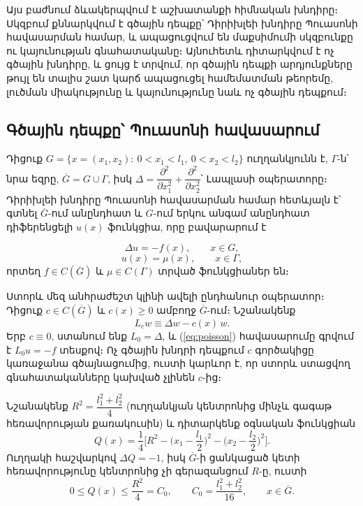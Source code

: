 \documentclass[12pt,a4paper]{article}
\theoremstyle{arm}
\theoremstyle{armdef}
\numberwithin{equation}{section}
\newcommand{\G}{\overline{G}}
\begin{document}
Այս բաժնում ձևակերպվում է աշխատանքի հիմնական խնդիրը։ Սկզբում քննարկվում է գծային դեպքը՝ Դիրիխլեի խնդիրը Պուասոնի հավասարման համար, և ապացուցվում են մաքսիմումի սկզբունքը ու կայունության գնահատականը։ Այնուհետև դիտարկվում է ոչ գծային խնդիրը, և ցույց է տրվում, որ գծային դեպքի արդյունքները թույլ են տալիս շատ կարճ ապացուցել համեմատման թեորեմը, լուծման միակությունը և կայունությունը նաև ոչ գծային դեպքում։

\subsection{Գծային դեպքը՝ Պուասոնի հավասարում}

Դիցուք $G=\{x=(x_1,x_2):\ 0<x_1<l_1,\ 0<x_2<l_2\}$ ուղղանկյունն է, $\Gamma$-ն՝ նրա եզրը, $\G=G\cup\Gamma$, իսկ $\Delta=\dfrac{\partial^2}{\partial x_1^2}+\dfrac{\partial^2}{\partial x_2^2}$՝ Լապլասի օպերատորը։ Դիրիխլեի խնդիրը Պուասոնի հավասարման համար հետևյալն է՝ գտնել $\G$-ում անընդհատ և $G$-ում երկու անգամ անընդհատ դիֆերենցելի $u(x)$ ֆունկցիա, որը բավարարում է

\begin{equation}\label{eq:poisson}
\Delta u=-f(x),\qquad x\in G,
\end{equation}
\begin{equation}\label{eq:poissonbc}
u(x)=\mu(x),\qquad x\in\Gamma,
\end{equation}
որտեղ $f\in C(\G)$ և $\mu\in C(\Gamma)$ տրված ֆունկցիաներ են։

Ստորև մեզ անհրաժեշտ կլինի ավելի ընդհանուր օպերատոր։ Դիցուք $c\in C(\G)$ և $c(x)\ge0$ ամբողջ $\G$-ում։ Նշանակենք
\begin{equation}\label{eq:Lc}
L_c w\equiv \Delta w-c(x)\,w.
\end{equation}
Երբ $c\equiv0$, ստանում ենք $L_0=\Delta$, և (\ref{eq:poisson}) հավասարումը գրվում է $L_0u=-f$ տեսքով։ Ոչ գծային խնդրի դեպքում $c$ գործակիցը կառաջանա գծայնացումից, ուստի կարևոր է, որ ստորև ստացվող գնահատականները կախված չլինեն $c$-ից։

Նշանակենք $R^2=\dfrac{l_1^2+l_2^2}{4}$ (ուղղանկյան կենտրոնից մինչև գագաթ հեռավորության քառակուսին) և դիտարկենք օգնական ֆունկցիան
\begin{equation}\label{eq:omega}
Q(x)=\frac14\Big[R^2-\Big(x_1-\frac{l_1}{2}\Big)^2-\Big(x_2-\frac{l_2}{2}\Big)^2\Big].
\end{equation}
Ուղղակի հաշվարկով $\Delta Q=-1$, իսկ $\G$-ի ցանկացած կետի հեռավորությունը կենտրոնից չի գերազանցում $R$-ը, ուստի
\begin{equation}\label{eq:C0}
0\le Q(x)\le\frac{R^2}{4}=C_0,\qquad C_0=\frac{l_1^2+l_2^2}{16},\qquad x\in\G.
\end{equation}
\end{document}
